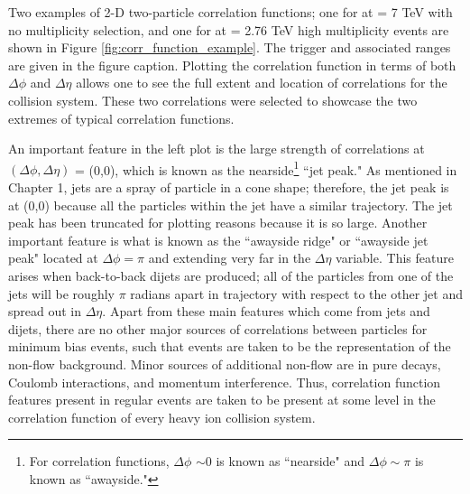 Two examples of 2-D two-particle correlation functions; one for \pp at \sqsn = 7 TeV with no multiplicity selection, and one for \pbpb at \sqsn = 2.76 TeV high multiplicity events are shown in Figure \ref{fig:corr_function_example}. The trigger and associated \pt ranges are given in the figure caption. Plotting the correlation function in terms of both $\Delta\phi$ and $\Delta\eta$ allows one to see the full extent and location of correlations for the collision system. These two correlations were selected to showcase the two extremes of typical correlation functions. 

An important feature in the left plot is the large strength of correlations at $(\Delta\phi,\Delta\eta)$ = (0,0), which is known as the nearside\footnote{For correlation functions, $\Delta\phi $ $\sim$0 is known as ``nearside" and $\Delta\phi  \sim\pi$ is known as ``awayside."} ``jet peak." As mentioned in Chapter 1, jets are a spray of particle in a cone shape; therefore, the jet peak is at (0,0) because all the particles within the jet have a similar trajectory. The jet peak has been truncated for plotting reasons because it is so large. Another important feature is what is known as the ``awayside ridge" or ``awayside jet peak" located at  $\Delta\phi = \pi$ and extending very far in the $\Delta\eta$ variable. This feature arises when back-to-back dijets are produced; all of the particles from one of the jets will be roughly $\pi$ radians apart in trajectory with respect to the other jet and spread out in $\Delta\eta$. Apart from these main features which come from jets and dijets, there are no other major sources of correlations between particles for minimum bias \pp events, such that \pp events are taken to be the representation of the non-flow background. Minor sources of additional non-flow are in pure decays, Coulomb interactions, and momentum interference. Thus, correlation function features present in regular \pp events are taken to be present at some level in the correlation function of every heavy ion collision system.


